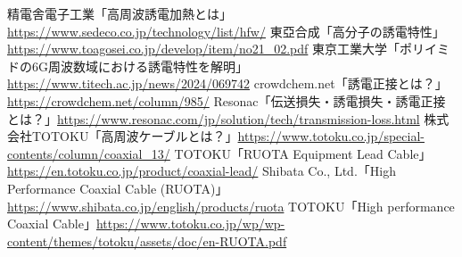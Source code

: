 \documentclass[11pt,a4paper]{ltjsarticle} %
\begin{document}
\begin{thebibliography}{99}
 精電舎電子工業「高周波誘電加熱とは」\url{https://www.sedeco.co.jp/technology/list/hfw/}
 東亞合成「高分子の誘電特性」\url{https://www.toagosei.co.jp/develop/item/no21_02.pdf}
 東京工業大学「ポリイミドの6G周波数域における誘電特性を解明」\url{https://www.titech.ac.jp/news/2024/069742}
 crowdchem.net「誘電正接とは？」\url{https://crowdchem.net/column/985/}
 Resonac「伝送損失・誘電損失・誘電正接とは？」\url{https://www.resonac.com/jp/solution/tech/transmission-loss.html}
 株式会社TOTOKU「高周波ケーブルとは？」\url{https://www.totoku.co.jp/special-contents/column/coaxial_13/}
 TOTOKU「RUOTA Equipment Lead Cable」\url{https://en.totoku.co.jp/product/coaxial-lead/}
 Shibata Co., Ltd.「High Performance Coaxial Cable (RUOTA)」\url{https://www.shibata.co.jp/english/products/ruota}
 TOTOKU「High performance Coaxial Cable」\url{https://www.totoku.co.jp/wp/wp-content/themes/totoku/assets/doc/en-RUOTA.pdf}
\end{thebibliography}
\end{document}
